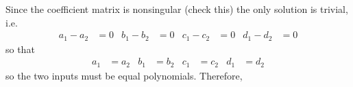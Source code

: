 \documentclass{ximera}
\begin{document}
\begin{example}
Since the coefficient matrix is nonsingular (check this) the only solution is trivial, i.e.
\begin{align*}
a_1-a_2&=0&b_1-b_2&=0&c_1-c_2&=0&d_1-d_2&=0
\end{align*}
so that
\begin{align*}
a_1&=a_2&b_1&=b_2&c_1&=c_2&d_1&=d_2
\end{align*}
so the two inputs must be equal polynomials.  Therefore,
\begin{multipleChoice}
\end{multipleChoice}

\end{example}
\end{document}
